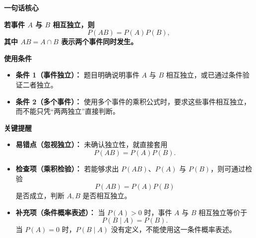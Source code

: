 \begin{summarybox}

	\textbf{\textcolor{CSummary}{一句话核心}}

	\textbf{
		若事件 $A$ 与 $B$ 相互独立，则
		\[
			P(AB)=P(A)P(B),
		\]
		其中 $AB=A\cap B$ 表示两个事件同时发生。
	}

	\medskip

	\textbf{\textcolor{CSummary}{使用条件}}

	\begin{itemize}[leftmargin=*, itemsep=0.5em, topsep=0.4em]
		\item \textbf{条件 1（事件独立）：}
		      题目明确说明事件 $A$ 与 $B$ 相互独立，或已通过条件验证二者独立。

		\item \textbf{条件 2（多个事件）：}
		      使用多个事件的乘积公式时，要求这些事件相互独立，而不能只凭“两两独立”直接判断。
	\end{itemize}

	\medskip

	\textbf{\textcolor{CSummary}{关键提醒}}

	\begin{itemize}[leftmargin=*, itemsep=0.5em, topsep=0.4em]
		\item \textbf{易错点（忽视独立）：}
		      未确认独立性，就直接套用
		      \[
			      P(AB)=P(A)P(B).
		      \]

		\item \textbf{检查项（乘积检验）：}
		      若能够求出 $P(AB)$、$P(A)$ 与 $P(B)$，则可通过检验
		      \[
			      P(AB)=P(A)P(B)
		      \]
		      是否成立，判断 $A,B$ 是否相互独立。

		\item \textbf{补充项（条件概率表述）：}
		      当 $P(A)>0$ 时，事件 $A$ 与 $B$ 相互独立等价于
		      \[
			      P(B\mid A)=P(B).
		      \]
		      当 $P(A)=0$ 时，$P(B\mid A)$ 没有定义，不能使用这一条件概率表述。
	\end{itemize}

\end{summarybox}